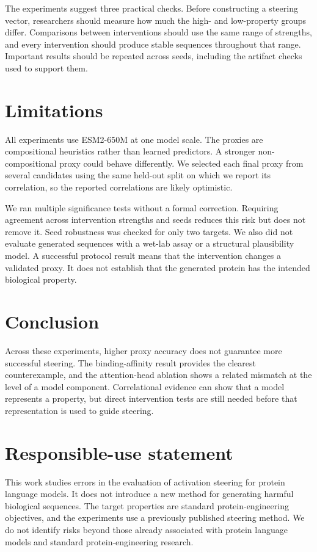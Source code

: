 \documentclass{article}
\begin{document}
The experiments suggest three practical checks. Before constructing a
steering vector, researchers should measure how much the high- and
low-property groups differ. Comparisons between interventions should use
the same range of strengths, and every intervention should produce
stable sequences throughout that range. Important results should be
repeated across seeds, including the artifact checks used to support
them.

\section{Limitations}

All experiments use ESM2-650M at one model scale. The proxies are
compositional heuristics rather than learned predictors. A stronger
non-compositional proxy could behave differently. We selected each final
proxy from several candidates using the same held-out split on which we
report its correlation, so the reported correlations are likely
optimistic.

We ran multiple significance tests without a formal correction. Requiring
agreement across intervention strengths and seeds reduces this risk but
does not remove it. Seed robustness was checked for only two targets.
We also did not evaluate generated sequences with a wet-lab assay or a
structural plausibility model. A successful protocol result means that
the intervention changes a validated proxy. It does not establish that
the generated protein has the intended biological property.

\section{Conclusion}

Across these experiments, higher proxy accuracy does not guarantee more
successful steering. The binding-affinity result provides the clearest
counterexample, and the attention-head ablation shows a related mismatch
at the level of a model component. Correlational evidence can show that a
model represents a property, but direct intervention tests are still
needed before that representation is used to guide steering.

\clearpage

\section*{Responsible-use statement}
This work studies errors in the evaluation of activation steering for
protein language models. It does not introduce a new method for
generating harmful biological sequences. The target properties are
standard protein-engineering objectives, and the experiments use a
previously published steering method. We do not identify risks beyond
those already associated with protein language models and standard
protein-engineering research.



\end{document}
